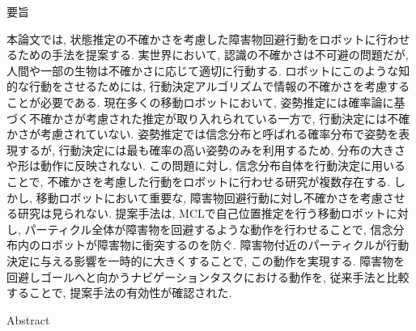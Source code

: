 \begin{center}
  要旨 \\%
  \vspace{0.7cm}{\LARGE \bf
    移動ロボットのための\\
    状態推定の不確かさを考慮した\\
    障害物回避行動の生成\\}
  \vspace{0.5cm}{\Large 鈴木 勇矢\\}
\end{center}
  \vspace{1.0cm}%
   \par

本論文では, 状態推定の不確かさを考慮した障害物回避行動をロボットに行わせるための手法を提案する. 
実世界において, 認識の不確かさは不可避の問題だが, 人間や一部の生物は不確かさに応じて適切に行動する. 
ロボットにこのような知的な行動をさせるためには, 行動決定アルゴリズムで情報の不確かさを考慮することが必要である. 
現在多くの移動ロボットにおいて, 姿勢推定には確率論に基づく不確かさが考慮された推定が取り入れられている一方で, 行動決定には不確かさが考慮されていない. 
姿勢推定では信念分布と呼ばれる確率分布で姿勢を表現するが, 行動決定には最も確率の高い姿勢のみを利用するため, 分布の大きさや形は動作に反映されない. 
この問題に対し, 信念分布自体を行動決定に用いることで, 不確かさを考慮した行動をロボットに行わせる研究が複数存在する. 
しかし, 移動ロボットにおいて重要な, 障害物回避行動に対し不確かさを考慮させる研究は見られない. 
提案手法は, MCLで自己位置推定を行う移動ロボットに対し, パーティクル全体が障害物を回避するような動作を行わせることで, 信念分布内のロボットが障害物に衝突するのを防ぐ. 
障害物付近のパーティクルが行動決定に与える影響を一時的に大きくすることで, この動作を実現する. 
障害物を回避しゴールへと向かうナビゲーションタスクにおける動作を, 従来手法と比較することで, 提案手法の有効性が確認された. 

\newpage

\begin{center}
  Abstract \\%
  \vspace{0.7cm}{\Large \bf
    Generation of Obstacle Avoidance Behavior\\
    Considering Uncertainty of State Estimation\\
    for Mobile Robot\\}
  \vspace{0.5cm}{\Large Yuya SUZUKI\\}
\end{center}
  \vspace{1.0cm}%
   \par

